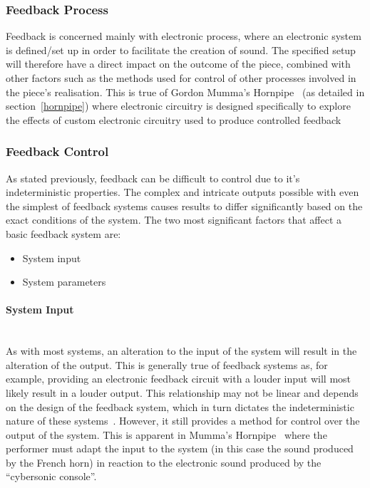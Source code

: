 \documentclass[titlepage]{scrartcl}
\begin{document}
    \subsubsection{Feedback Process}
    Feedback is concerned mainly with electronic process, where an electronic
    system is defined/set up in order to facilitate the creation of sound. The
    specified setup will therefore have a direct impact on the outcome of the
    piece, combined with other factors such as the methods used for control of other
    processes involved in the piece's realisation. This is true of Gordon
    Mumma's Hornpipe~\citeyearpar{mumma2002lem} (as detailed in
    section~\ref{hornpipe}) where electronic circuitry is designed specifically
    to explore the effects of custom electronic circuitry used to produce
    controlled feedback~\parencite[p.8, 390]{nyman1999em}\\

    \subsubsection{Feedback Control}
    As stated previously, feedback can be difficult to control due to it's
    indeterministic properties. The complex and intricate outputs possible with
    even the simplest of feedback systems causes results to differ
    significantly based on the exact conditions of the system. The two most
    significant factors that affect a basic feedback system are:
    \begin{itemize}
        \item System input
        \item System parameters
    \end{itemize}

    \paragraph{System Input}\mbox{}\\ 
    As with most systems, an alteration to the input of the system will result
    in the alteration of the output. This is generally true of feedback systems
    as, for example, providing an electronic feedback circuit with a louder
    input will most likely result in a louder output. This relationship may not
    be linear and depends on the design of the feedback system, which in turn
    dictates the indeterministic nature of these
    systems~\parencite[p.19-27]{weisert2010ioi}. However, it still provides a
    method for control over the output of the system. This is apparent in
    Mumma's Hornpipe~\citeyearpar{mumma2002lem} where the performer must adapt
    the input to the system (in this case the sound produced by the French
    horn) in reaction to the electronic sound produced by the ``cybersonic
    console''.
    
\end{document}
